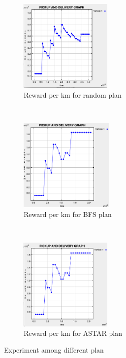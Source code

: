 \documentclass[10.5pt]{article}
\begin{document}
\begin{figure}[h]
    \centering
    \begin{subfigure}{.3\textwidth}
        \includegraphics[width = \textwidth, height=4.5cm]{random-6task.png}
        \caption{Reward per km for random plan}
        \label{fig:growth-2-energy-100}
    \end{subfigure}%
    ~
    \begin{subfigure}{.3\textwidth}
        \includegraphics[width = \textwidth, height=4.5cm]{bfs-6task.png}
        \caption{Reward per km for BFS plan}
        \label{fig:energy-100-startEnergy-15-world-100-100}
    \end{subfigure}
    ~
    \begin{subfigure}{.3\textwidth}
        \includegraphics[width = \textwidth, height=4.5cm]{astar-6task.png}
        \caption{Reward per km for ASTAR plan}
    \end{subfigure}
    \caption{Experiment among different plan}\label{fig:exp-3}
\end{figure}
\end{document}
